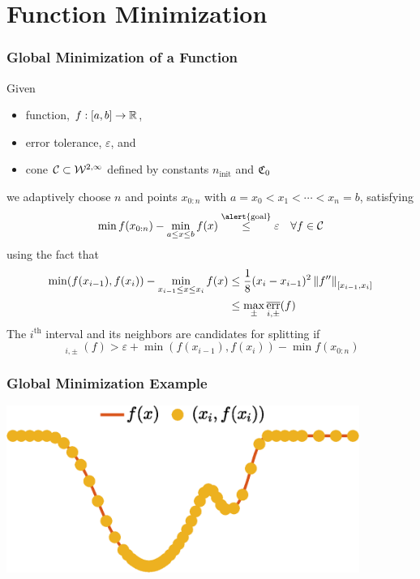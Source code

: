 \documentclass[12pt,compress,xcolor={usenames,dvipsnames}]{beamer} %
\DeclareMathOperator{\init}{init}
\DeclareMathOperator{\oerr}{\overline{err}}
\begin{document}
\section{Function Minimization}
\begin{frame}
	\frametitle{Global Minimization of a Function}
		\vspace{-4ex}
		
		Given 
		
		\vspace{-3ex}
		\begin{itemize}
			\item \alert{function}, $f:[a,b] \to \mathbb{R}$, 
			\item \alert{error tolerance}, $\varepsilon$, and 
			\item \alert{cone} $\mathcal{C} \subset \mathcal{W}^{2,\infty}$ defined by constants $n_{\init}$ and $\mathfrak{C}_0$
		\end{itemize}
		\vspace{-3ex}
		we \alert{adaptively} choose $n$ and points $x_{0:n}$ with $a = x_0 <x_1 < \cdots < x_n = b$, satisfying
		\begin{equation*}
		\min f(x_{0:n}) - \min_{a \le x \le b} f(x)  \overset{\text{\alert{goal}}}{\le} \varepsilon \quad \forall f \in \cc 
		\end{equation*}
	using the fact that
	\begin{align*}
	\min(f(x_{i-1}), f(x_i)) - \min_{x_{i-1} \le x \le x_i} f(x) & \le \frac{1}{8}(x_{i}-x_{i-1})^2\norm[{[x_{i-1},x_i]}]{f''} \\
	& \le \max_{\pm} \oerr_{i,\pm}(f)
	\end{align*}
	The $i^{\text{th}}$ interval and its neighbors are candidates for splitting if 
	\[
	\oerr_{i,\pm}(f) > \varepsilon + \min(f(x_{i-1}), f(x_i)) - \min f(x_{0:n})
	\]
		
\end{frame}

\begin{frame}
	\frametitle{Global Minimization Example}
\centerline{\includegraphics[width = 11.5cm]{ProgramsImages/sampling-funming.eps}}
\end{frame}
\end{document}
